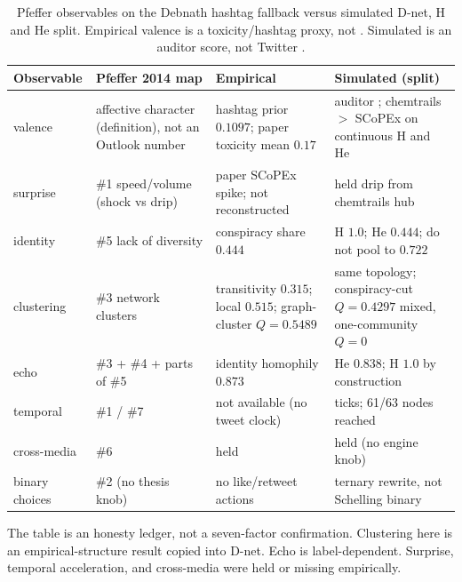 \begin{table}[t]
\centering
\caption{Pfeffer observables on the Debnath hashtag fallback versus simulated D-net, H and He split.
Empirical valence is a toxicity/hashtag proxy, not \MPR{}.
Simulated \MI{} is an auditor score, not Twitter \MI{}.}
\label{tab:pfeffer}
\scriptsize
\begin{tabular}{>{\raggedright\arraybackslash}p{}
                >{\raggedright\arraybackslash}p{}
                >{\raggedright\arraybackslash}p{}
                >{\raggedright\arraybackslash}p{}}
\toprule
Observable & Pfeffer 2014 map & Empirical & Simulated (split) \\
\midrule
valence & affective character (definition), not an Outlook number & hashtag prior $0.1097$; paper toxicity mean $0.17$ & auditor \MI{}; chemtrails $>$ SCoPEx on continuous H and He \\
surprise & \#1 speed/volume (shock vs drip) & paper SCoPEx spike; not reconstructed & held drip from chemtrails hub \\
identity & \#5 lack of diversity & conspiracy share $0.444$ & H $1.0$; He $0.444$; do not pool to $0.722$ \\
clustering & \#3 network clusters & transitivity $0.315$; local $0.515$; graph-cluster $Q=0.5489$ & same topology; conspiracy-cut $Q=0.4297$ mixed, one-community $Q=0$ \\
echo & \#3 + \#4 + parts of \#5 & identity homophily $0.873$ & He $0.838$; H $1.0$ by construction \\
temporal & \#1 / \#7 & not available (no tweet clock) & 8 ticks; 61/63 nodes reached \\
cross-media & \#6 & held & held (no engine knob) \\
binary choices & \#2 (no thesis knob) & no like/retweet actions & ternary rewrite, not Schelling binary \\
\bottomrule
\end{tabular}
\end{table}

The table is an honesty ledger, not a seven-factor confirmation.
Clustering here is an empirical-structure result copied into D-net.
Echo is label-dependent.
Surprise, temporal acceleration, and cross-media were held or missing empirically.
